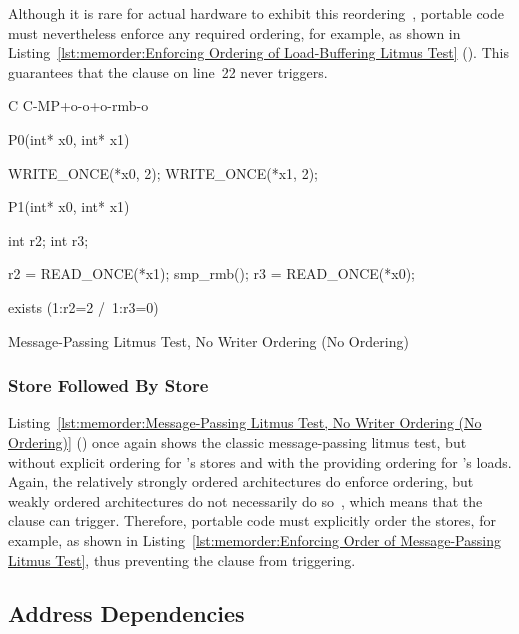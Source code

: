 Although it is rare for actual hardware to
exhibit this reordering~\cite{LucMaranget2017aarch64},
portable code must nevertheless enforce any required ordering, for example,
as shown in
Listing~\ref{lst:memorder:Enforcing Ordering of Load-Buffering Litmus Test}
().
This guarantees that the  clause on line~22 never triggers.

\begin{listing}[tbp]
{ \scriptsize
\begin{verbbox}[\LstLineNo]
C C-MP+o-o+o-rmb-o

{
}

P0(int* x0, int* x1) {

  WRITE_ONCE(*x0, 2);
  WRITE_ONCE(*x1, 2);

}

P1(int* x0, int* x1) {

  int r2;
  int r3;

  r2 = READ_ONCE(*x1);
  smp_rmb();
  r3 = READ_ONCE(*x0);

}

exists (1:r2=2 /\ 1:r3=0)
\end{verbbox}
}
\centering
\theverbbox
\caption{Message-Passing Litmus Test, No Writer Ordering (No Ordering)}
\label{lst:memorder:Message-Passing Litmus Test, No Writer Ordering (No Ordering)}
\end{listing}

\subsubsection{Store Followed By Store}
Listing~\ref{lst:memorder:Message-Passing Litmus Test, No Writer Ordering (No Ordering)}
()
once again shows the classic message-passing litmus test, but without
explicit ordering for 's stores and with the 
providing ordering for 's loads.
Again, the relatively strongly ordered architectures do enforce ordering,
but weakly ordered architectures do not necessarily do
so~\cite{JadeAlglave2011ppcmem}, which means that the
 clause can trigger.
Therefore, portable code must explicitly order the stores, for
example, as shown in
Listing~\ref{lst:memorder:Enforcing Order of Message-Passing Litmus Test},
thus preventing the  clause from triggering.

\subsection{Address Dependencies}
\label{sec:memorder:Address Dependencies}

